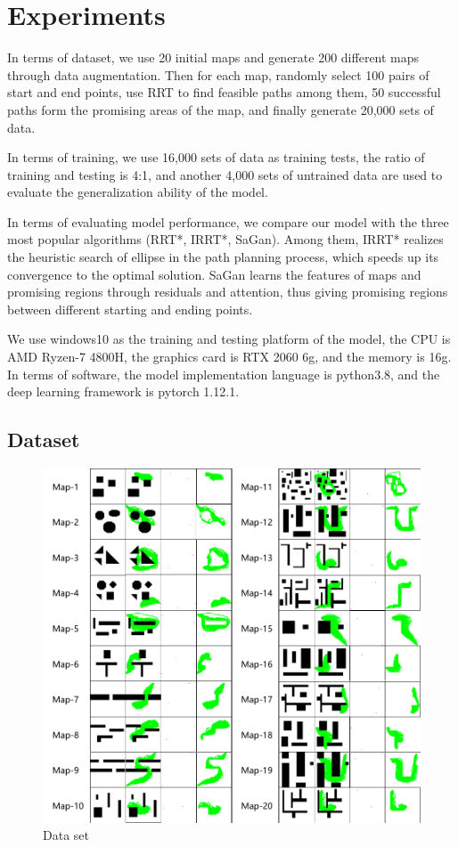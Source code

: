 \documentclass[smallcondensed]{svjour3}     %
\begin{document}
\section{Experiments}\label{section: Experiments}
In terms of dataset, we use 20 initial maps and generate 200 different maps through data augmentation. 
Then for each map, randomly select 100 pairs of start and end points, use RRT to find feasible paths among them, 50 successful paths form the promising areas of the map, and finally generate 20,000 sets of data.

In terms of training, we use 16,000 sets of data as training tests, the ratio of training and testing is 4:1, and another 4,000 sets of untrained data are used to evaluate the generalization ability of the model.

In terms of evaluating model performance, we compare our model with the three most popular algorithms (RRT*, IRRT*, SaGan). 
Among them, IRRT* realizes the heuristic search of ellipse in the path planning process, which speeds up its convergence to the optimal solution. 
SaGan learns the features of maps and promising regions through residuals and attention, thus giving promising regions between different starting and ending points.

We use windows10 as the training and testing platform of the model, the CPU is AMD Ryzen-7 4800H, the graphics card is RTX 2060 6g, and the memory is 16g. 
In terms of software, the model implementation language is python3.8, and the deep learning framework is pytorch 1.12.1.

\subsection{Dataset}
\begin{figure}
\centering
\includegraphics[scale=0.45]{data-set.pdf}%
\caption{Data set}     
\label{fig:data-set}
\end{figure}
\end{document}
